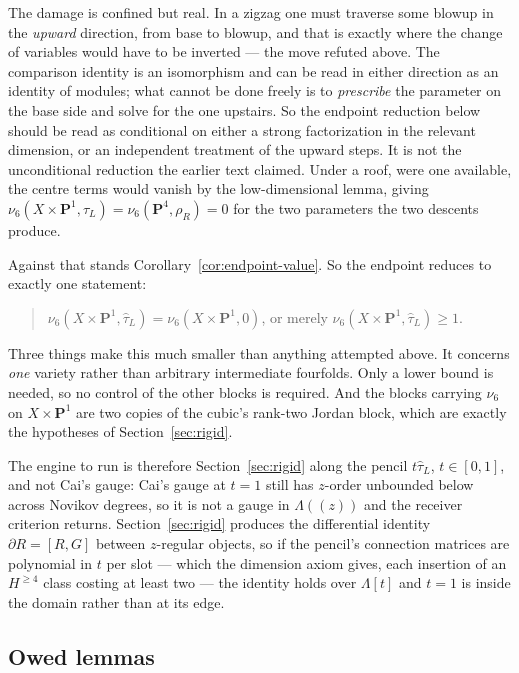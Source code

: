 \documentclass[11pt]{article}
\theoremstyle{definition}
\theoremstyle{remark}
\newcommand{\PP}{\mathbf P}
\begin{document}
The damage is confined but real. In a zigzag one must traverse some blowup in the
\emph{upward} direction, from base to blowup, and that is exactly where the
change of variables would have to be inverted --- the move refuted above. The
comparison identity is an isomorphism and can be read in either direction as an
identity of modules; what cannot be done freely is to \emph{prescribe} the
parameter on the base side and solve for the one upstairs. So the endpoint
reduction below should be read as conditional on either a strong factorization in
the relevant dimension, or an independent treatment of the upward steps. It is
not the unconditional reduction the earlier text claimed. Under a roof, were one
available, the centre terms would vanish by the low-dimensional lemma, giving
$\nu_6(X\times\PP^1,\widehat\tau_L)=\nu_6(\PP^4,\rho_R)=0$ for the two parameters
the two descents produce.

Against that stands Corollary~\ref{cor:endpoint-value}. So the endpoint reduces
to exactly one statement:
\begin{quote}
  $\nu_6(X\times\PP^1,\widehat\tau_L)=\nu_6(X\times\PP^1,0)$, or merely
  $\nu_6(X\times\PP^1,\widehat\tau_L)\ge1$.
\end{quote}
Three things make this much smaller than anything attempted above. It concerns
\emph{one} variety rather than arbitrary intermediate fourfolds. Only a lower
bound is needed, so no control of the other blocks is required. And the blocks
carrying $\nu_6$ on $X\times\PP^1$ are two copies of the cubic's rank-two Jordan
block, which are exactly the hypotheses of Section~\ref{sec:rigid}.

The engine to run is therefore Section~\ref{sec:rigid} along the pencil
$t\widehat\tau_L$, $t\in[0,1]$, and not Cai's gauge: Cai's gauge at $t=1$ still
has $z$-order unbounded below across Novikov degrees, so it is not a gauge in
$\Lambda(\!(z)\!)$ and the receiver criterion returns. Section~\ref{sec:rigid}
produces the differential identity $\partial R=[R,G]$ between $z$-regular
objects, so if the pencil's connection matrices are polynomial in $t$ per slot ---
which the dimension axiom gives, each insertion of an $H^{\ge4}$ class costing at
least two --- the identity holds over $\Lambda[t]$ and $t=1$ is inside the domain
rather than at its edge.

\subsection*{Owed lemmas}
\end{document}
